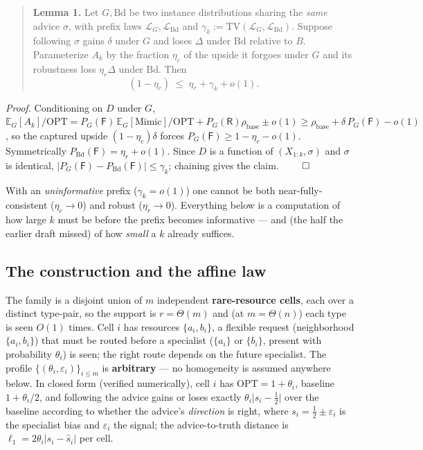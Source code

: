 \begin{quote}
\textbf{Lemma 1.} Let \(G,\mathrm{Bd}\) be two instance distributions
sharing the \emph{same} advice \(\sigma\), with prefix laws
\(\mathcal L_G,\mathcal L_{\mathrm{Bd}}\) and
\(\gamma_k:=\mathrm{TV}(\mathcal L_G,\mathcal L_{\mathrm{Bd}})\).
Suppose following \(\sigma\) gains \(\delta\) under \(G\) and loses
\(\Delta\) under \(\mathrm{Bd}\) relative to \(B\). Parameterize \(A_k\)
by the fraction \(\eta_c\) of the upside it forgoes under \(G\) and its
robustness loss \(\eta_r\Delta\) under \(\mathrm{Bd}\). Then
\[(1-\eta_c)\;\le\;\eta_r+\gamma_k+o(1).\]
\end{quote}

\emph{Proof.} Conditioning on \(D\) under \(G\),
\(\mathbb E_G[A_k]/\mathrm{OPT} = P_G(\mathsf F)\,
\mathbb E_G[\mathrm{Mimic}]/\mathrm{OPT} + P_G(\mathsf R)\rho_{\mathrm{base}} \pm o(1) \ge
\rho_{\mathrm{base}} + \delta\,P_G(\mathsf F)-o(1)\), so the captured
upside \((1-\eta_c)\delta\) forces \(P_G(\mathsf F)\ge 1-\eta_c-o(1)\).
Symmetrically \(P_{\mathrm{Bd}}(\mathsf F)=\eta_r
+o(1)\). Since \(D\) is a function of \((X_{1:k},\sigma)\) and
\(\sigma\) is identical,
\(|P_G(\mathsf F)-P_{\mathrm{Bd}}(\mathsf F)|\le\gamma_k\); chaining
gives the claim. \(\qed\)

With an \emph{uninformative} prefix (\(\gamma_k=o(1)\)) one cannot be
both near-fully-consistent (\(\eta_c\to0\)) and robust (\(\eta_r\to0\)).
Everything below is a computation of how large \(k\) must be before the
prefix becomes informative --- and (the half the earlier draft missed)
of how \emph{small} a \(k\) already suffices.

\subsection{The construction and the affine
law}

The family is a disjoint union of \(m\) independent
\textbf{rare-resource cells}, each over a distinct type-pair, so the
support is \(r=\Theta(m)\) and (at \(m = \Theta(n)\)) each type is seen
\(O(1)\) times. Cell \(i\) has resources \(\{a_i,b_i\}\), a flexible
request (neighborhood \(\{a_i,b_i\}\)) that must be routed before a
specialist (\(\{a_i\}\) or \(\{b_i\}\), present with probability
\(\theta_i\)) is seen; the right route depends on the future specialist.
The profile \(\{(\theta_i,\varepsilon_i)\}_{i\le m}\) is
\textbf{arbitrary} --- no homogeneity is assumed anywhere below. In
closed form (verified numerically), cell \(i\) has
\(\mathrm{OPT}=1+\theta_i\), baseline \(1+\theta_i/2\), and following
the advice gains or loses exactly \(\theta_i\lvert s_i-\tfrac12\rvert\)
over the baseline according to whether the advice's \emph{direction} is
right, where \(s_i = \tfrac12 \pm \varepsilon_i\) is the specialist bias
and \(\varepsilon_i\) the signal; the advice-to-truth distance is
\(\ell_1=2\theta_i\lvert s_i-\hat s_i\rvert\) per cell.

